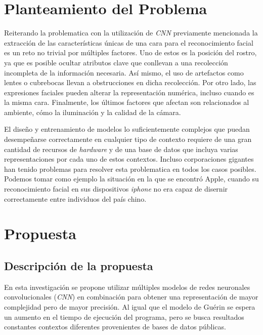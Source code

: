 \documentclass[a4paper, 10pt, conference]{ieeeconf}      %
\begin{document}
    \section{Planteamiento del Problema}
    Reiterando la problematica con la utilización de \textit{CNN} previamente mencionada
    la extracción de las características únicas de una cara para el reconocimiento facial
    es un reto no trivial por múltiples factores. Uno de estos es la posición del rostro,
    ya que es posible ocultar atributos clave que conllevan a una recolección incompleta
    de la información necesaria. Así mismo, el uso de artefactos como lentes o cubrebocas
    llevan a obstrucciones en dicha recolección. Por otro lado, las expresiones faciales
    pueden alterar la representación numérica, incluso cuando es la misma cara. Finalmente,
    los últimos factores que afectan son relacionados al ambiente, cómo la iluminación
    y la calidad de la cámara. \cite{Bodini2019}

    El diseño y entrenamiento de modelos lo suficientemente complejos que puedan desempeñarse
    correctamente en cualquier tipo de contexto requiere de una gran cantidad de recursos de
    \textit{hardware} y de una base de datos que incluya varias representaciones por cada uno
    de estos contextos. Incluso corporaciones gigantes han tenido problemas para resolver esta
    problematica en todos los casos posibles. Podemos tomar como ejemplo la situación en la que
    se encontró Apple, cuando su reconocimiento facial en sus dispositivos \textit{iphone} no
    era capaz de disernir correctamente entre individuos del país chino. \cite{Birchall2017}


    \section{Propuesta}

    \subsection{Descripción de la propuesta}
    En esta investigación se propone utilizar múltiples modelos de redes neuronales convolucionales
    (\textit{CNN}) en combinación para obtener una representación de mayor complejidad pero de
    mayor precisión. Al igual que el modelo de Guérin \cite{CombiningCNN} se espera un aumento 
    en el tiempo de ejecución del programa, pero se busca resultados constantes contextos
    diferentes provenientes de bases de datos públicas.
\end{document}
